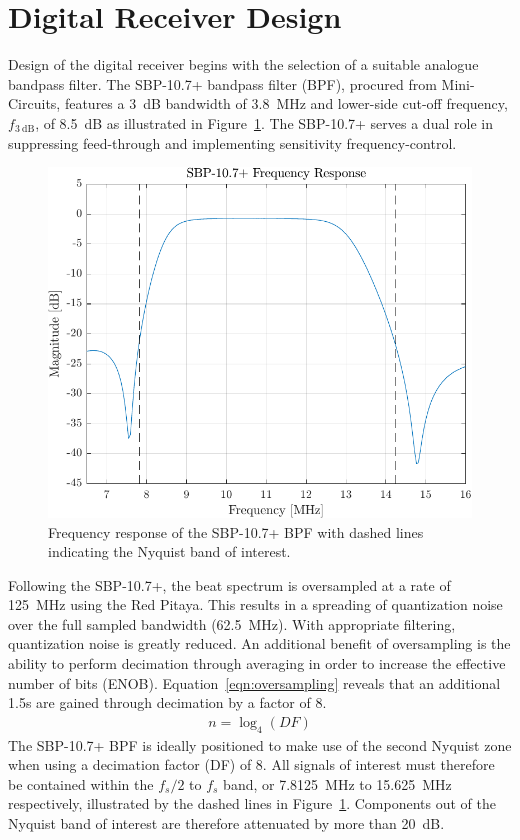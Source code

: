 \documentclass[a4paper,11pt]{report}
\begin{document}
\section{Digital Receiver Design}
Design of the digital receiver begins with the selection of a suitable analogue bandpass filter. The SBP-10.7+ bandpass filter (BPF), procured from Mini-Circuits, features a \SI{3}{\dB} bandwidth of \SI{3.8}{MHz} and lower-side cut-off frequency, $ f_{\SI{3}{\dB}} $, of \SI{8.5}{\dB} as illustrated in Figure~\ref{fig:band_pass_response}. The SBP-10.7+ serves a dual role in suppressing feed-through and implementing sensitivity frequency-control. 
\begin{figure}[h!]
    \begin{center}
        \includegraphics[width=\textwidth]{images/band_pass_response}
        \caption{Frequency response of the SBP-10.7+ BPF with dashed lines indicating the Nyquist band of interest.}
        \label{fig:band_pass_response}
    \end{center}
\end{figure}

Following the SBP-10.7+, the beat spectrum is oversampled at a rate of \SI{125}{\MHz} using the Red Pitaya. This results in a spreading of quantization noise over the full sampled bandwidth (\SI{62.5}{\MHz}). With appropriate filtering, quantization noise is greatly reduced. An additional benefit of oversampling is the ability to perform decimation through averaging in order to increase the effective number of bits (ENOB). Equation~\ref{eqn:oversampling} reveals that an additional \SI{1.5}{\bit}s are gained through decimation by a factor of 8.
\begin{align} \label{eqn:oversampling}
n = \log_4 (DF)
\end{align}
The SBP-10.7+ BPF is ideally positioned to make use of the second Nyquist zone when using a decimation factor (DF) of 8. All signals of interest must therefore be contained within the $ f_{s}/2 $ to $ f_{s} $ band, or \SI{7.8125}{\MHz} to \SI{15.625}{\MHz} respectively, illustrated by the dashed lines in Figure~\ref{fig:band_pass_response}. Components out of the Nyquist band of interest are therefore attenuated by more than \SI{20}{\dB}. 
\end{document}
